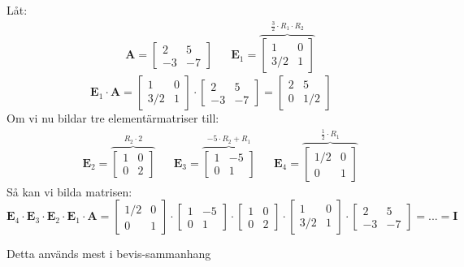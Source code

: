 \begin{Ex}
    Låt:
    \begin{align*}
    &&\mathbf{A} = \begin{bmatrix} 2 & 5\\-3&-7 \end{bmatrix}
    &&\mathbf{E}_1 = \overbrace{\begin{bmatrix} 1 & 0\\3/2 & 1 \end{bmatrix}}^{\frac{3}{2} \cdot R_1 \cdot R_2}
    \end{align*}
    \[
        \mathbf{E}_1 \cdot \mathbf{A} = \begin{bmatrix} 1 & 0\\3/2 & 1 \end{bmatrix} \cdot \begin{bmatrix} 2&5\\-3&-7 \end{bmatrix} = \begin{bmatrix} 2&5\\0&1/2 \end{bmatrix}
    \]
    Om vi nu bildar tre elementärmatriser till:
    \begin{align*}
    &&\mathbf{E}_2 = \overbrace{\begin{bmatrix} 1&0\\0&2 \end{bmatrix}}^\text{$R_2 \cdot 2$}
    &&\mathbf{E}_3 = \overbrace{\begin{bmatrix} 1&-5\\0&1 \end{bmatrix}}^\text{$-5 \cdot R_2 + R_1$}
    &&\mathbf{E}_4 = \overbrace{\begin{bmatrix} 1/2&0\\0&1 \end{bmatrix}}^\text{$\frac{1}{2} \cdot R_1$}
    \end{align*}
    Så kan vi bilda matrisen:
    \[
        \mathbf{E}_4 \cdot \mathbf{E}_3 \cdot \mathbf{E}_2 \cdot \mathbf{E}_1 \cdot \mathbf{A} = \begin{bmatrix} 1/2&0\\0&1 \end{bmatrix} \cdot \begin{bmatrix} 1&-5\\0&1 \end{bmatrix} \cdot \begin{bmatrix} 1&0\\0&2 \end{bmatrix} \cdot \begin{bmatrix} 1 & 0\\3/2 & 1 \end{bmatrix} \cdot \begin{bmatrix} 2&5\\-3&-7 \end{bmatrix} = ... = \mathbf{I}
    \]
\end{Ex}
\begin{Rem}
    Detta används mest i bevis-sammanhang
\end{Rem}
